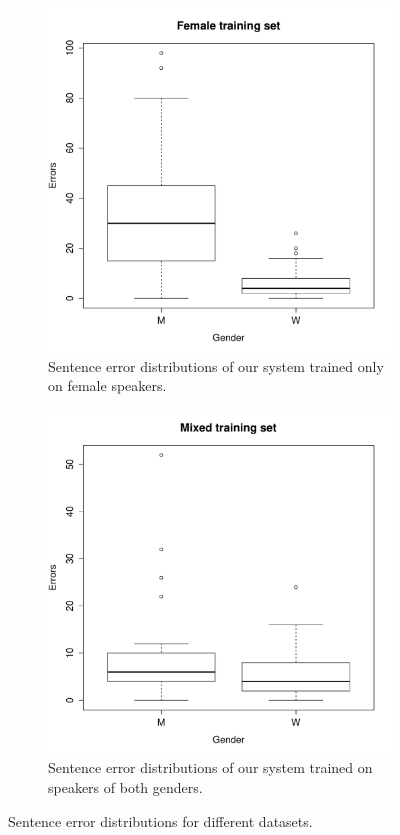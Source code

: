 \documentclass[twocolumn, 11pt]{article}
\begin{document}
\begin{figure}[h]
  \ContinuedFloat%
  \begin{subfigure}{\columnwidth}
    \includegraphics[width=\columnwidth]{female_only.pdf}
    \caption{\label{fig:female} Sentence error distributions of our system trained only on female speakers. }
  \end{subfigure}
  \begin{subfigure}{\columnwidth}
    \includegraphics[width=\columnwidth]{mixed.pdf}
    \caption{\label{fig:mixed} Sentence error distributions of our system trained on speakers of both genders. }
  \end{subfigure}
  \caption{Sentence error distributions for different
  datasets.}\label{fig:boxplots}
\end{figure}
\end{document}
